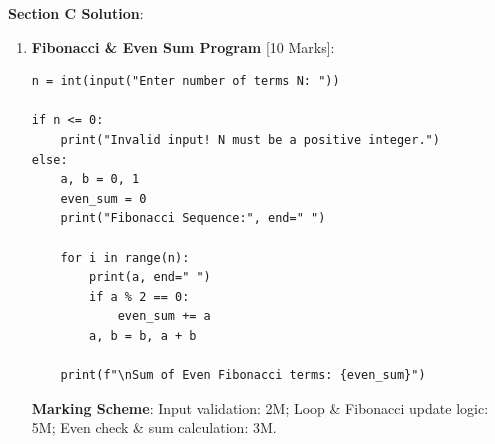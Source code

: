 \begin{solutionbox}
\noindent\textbf{Section C Solution}:
\begin{enumerate}[start=7]
    \item \textbf{Fibonacci \& Even Sum Program} [10 Marks]:
\begin{lstlisting}[language=Python3]
n = int(input("Enter number of terms N: "))

if n <= 0:
    print("Invalid input! N must be a positive integer.")
else:
    a, b = 0, 1
    even_sum = 0
    print("Fibonacci Sequence:", end=" ")
    
    for i in range(n):
        print(a, end=" ")
        if a % 2 == 0:
            even_sum += a
        a, b = b, a + b
        
    print(f"\nSum of Even Fibonacci terms: {even_sum}")
\end{lstlisting}
\textbf{Marking Scheme}: Input validation: 2M; Loop \& Fibonacci update logic: 5M; Even check \& sum calculation: 3M.
\end{enumerate}
\end{solutionbox}

